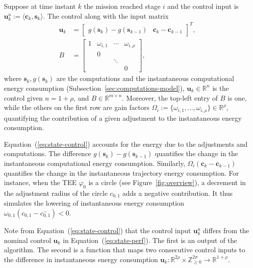 \documentclass[letterpaper,10pt,conference]{ieeeconf}
\theoremstyle{definition}
\begin{document}
Suppose at time instant $k$ the mission reached stage $i$ and the control input is $\mathbf{u}_k^a:=\langle\mathbf{c}_k,\mathbf{s}_k\rangle$. The control along with the input matrix
\begin{equation}\label{eq:state-control}\begin{split}  
  \mathbf{u}_k&=\begin{bmatrix}g(\mathbf{s}_k)-g(\mathbf{s}_{k-1}) & \mathbf{c}_k-\mathbf{c}_{k-1}\end{bmatrix}^T,\\
  B&=\left[\begin{array}{cccc}
    1& \omega_{i,1}& \cdots& \omega_{i,\rho}  \\
     &            0&       &  \\
     &             & \ddots&  \\
     &             &       & 0
  \end{array}\right],
\end{split}\end{equation}
where $\mathbf{s}_k,g(\mathbf{s}_k)$ are the computations and the instantaneous computational energy consumption (Subsection~\ref{sec:computations-model}), $\mathbf{u}_k\in\mathbb{R}^n$ is the control given $n=1+\rho$, and $B\in\mathbb{R}^{m\times n}$. Moreover, the top-left entry of $B$ is one, while the others on the first row are gain factors $\Omega_{i}:=\{\omega_{i,1},\dots, \omega_{i,\rho}\}\in\mathbb{R}^\rho$, quantifying the contribution of a given adjustment to the instantaneous energy consumption. 

Equation~(\ref{eq:state-control}) accounts for the energy due to the adjustments and computations. The difference $g(\mathbf{s}_k)-g(\mathbf{s}_{k-1})$ quantifies the change in the instantaneous computational energy consumption. Similarly, $\Omega_i(\mathbf{c}_k-\mathbf{c}_{k-1})$ quantifies the change in the instantaneous trajectory energy consumption. For instance, when the TEE $\varphi_0$ is a circle (see Figure~\ref{fig:overview}), a decrement in the adjustment radius of the circle $c_{0,1}$ adds a negative contribution. It thus simulates the lowering of instantaneous energy consumption $\omega_{0,1}(c_{0,1}-c_{0,1}^-)<0$.

Note from Equation~(\ref{eq:state-control}) that the control input $\mathbf{u}_k^a$ differs from the nominal control $\mathbf{u}_k$ in Equation~(\ref{eq:state-perf}). The first is an output of the algorithm. The second is a function that maps two consecutive control inputs to the difference in instantaneous energy consumption $\mathbf{u}_k:\mathbb{R}^{2\rho}\times\mathbb{Z}_{\geq 0}^{2\sigma}\rightarrow\mathbb{R}^{1+\rho}$.
\end{document}
